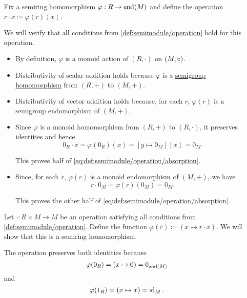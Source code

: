 \begin{defproof}
   Fix a semiring homomorphism \( \varphi: R \to \operatorname{end}(M) \) and define the operation \( r \cdot x \coloneqq \varphi(r)(x) \).

  We will verify that all conditions from \cref{def:semimodule/operation} hold for this operation.

  \begin{itemize}
    \item By definition, \( \varphi \) is a monoid action of \( (R, \cdot) \) on \( (M, \bincirc) \).

    \item Distributivity of scalar addition holds because \( \varphi \) is a \hyperref[def:semigroup/homomorphism]{semigroup homomorphism} from \( (R, +) \) to \( (M, +) \).

    \item Distributivity of vector addition holds because, for each \( r \), \( \varphi(r) \) is a semigroup endomorphism of \( (M, +) \).

    \item Since \( \varphi \) is a monoid homomorphism from \( (R,  +) \) to \( (R, \cdot) \), it preserves identities and hence
    \begin{equation*}
      0_R \cdot x = \varphi(0_R)(x) = [y \mapsto 0_M](x) = 0_M.
    \end{equation*}

    This proves half of \eqref{eq:def:semimodule/operation/absorption}.

    \item Since, for each \( r \), \( \varphi(r) \) is a monoid endomorphism of \( (M, +) \), we have
    \begin{equation*}
      r \cdot 0_M = \varphi(r)(0_M) = 0_M.
    \end{equation*}

    This proves the other half of \eqref{eq:def:semimodule/operation/absorption}.
  \end{itemize}

   Let \( \cdot: R \times M \to M \) be an operation satisfying all conditions from \cref{def:semimodule/operation}. Define the function \( \varphi(r) \coloneqq (x \mapsto r \cdot x) \). We will show that this is a semiring homomorphism.

  The operation preserves both identities because
  \begin{equation*}
    \varphi(0_R) = (x \mapsto 0) = 0_{\operatorname{end}(M)}
  \end{equation*}
  and
  \begin{equation*}
    \varphi(1_R) = (x \mapsto x) = \operatorname{id}_M.
  \end{equation*}


\end{defproof}
